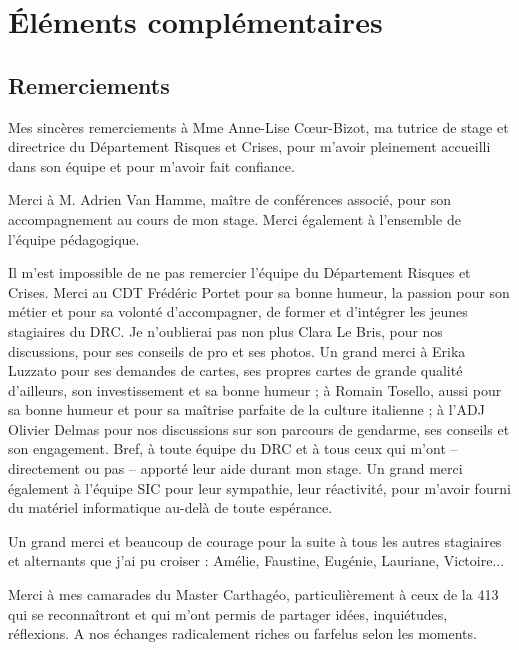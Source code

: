 \documentclass[10pt,a4paper]{report} %
\newcommand{\mychapter}[2]{ %
    \setcounter{chapter}{#1}
    \setcounter{section}{0}
    \chapter*{#2}
    \addcontentsline{toc}{chapter}{#2}
}
\begin{document}
\newpage
\thispagestyle{empty}
\mbox{}
\newpage

\part{Éléments complémentaires}

\mychapter{8}{Remerciements}

Mes sincères remerciements à Mme Anne-Lise Cœur-Bizot, ma tutrice de stage et directrice du Département Risques et Crises, pour m’avoir pleinement accueilli dans son équipe et pour m’avoir fait confiance.

Merci à M. Adrien Van Hamme, maître de conférences associé, pour son accompagnement au cours de mon stage. Merci également à l’ensemble de l’équipe pédagogique.

Il m’est impossible de ne pas remercier l’équipe du Département Risques et Crises. 
Merci au CDT Frédéric Portet pour sa bonne humeur, la passion pour son métier et pour sa volonté d’accompagner, de former et d’intégrer les jeunes stagiaires du DRC. 
Je n’oublierai pas non plus Clara Le Bris, pour nos discussions, pour ses conseils de pro et ses photos. Un grand merci à Erika Luzzato pour ses demandes de cartes, ses propres cartes de grande qualité d’ailleurs, son investissement et sa bonne humeur ; 
à Romain Tosello, aussi pour sa bonne humeur et pour sa maîtrise parfaite de la culture italienne ; à l’ADJ Olivier Delmas pour nos discussions sur son parcours de gendarme, ses conseils et son engagement. 
Bref, à toute équipe du DRC et à tous ceux qui m’ont – directement ou pas – apporté leur aide durant mon stage. 
Un grand merci également à l’équipe SIC pour leur sympathie, leur réactivité, pour m’avoir fourni du matériel informatique au-delà de toute espérance.

Un grand merci et beaucoup de courage pour la suite à tous les autres stagiaires et alternants que j’ai pu croiser : Amélie, Faustine, Eugénie, Lauriane, Victoire...

Merci à mes camarades du Master Carthagéo, particulièrement à ceux de la 413 qui se reconnaîtront et qui m’ont permis de partager idées, inquiétudes, réflexions. A nos échanges radicalement riches ou farfelus selon les moments.

\nocite{*}
\printbibliography[heading=bibintoc, title=Bibliographie]

\newpage
\end{document}
